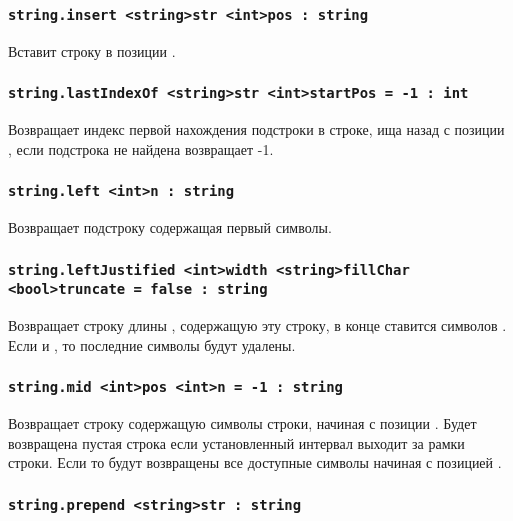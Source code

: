 \documentclass[a4paper, 14pt]{extarticle}
\begin{document}
\subsubsection{\lstinline|string.insert <string>str <int>pos : string|}

Вставит строку  в позиции .

\subsubsection{\lstinline|string.lastIndexOf <string>str <int>startPos = -1 : int|}

Возвращает индекс первой нахождения подстроки  в строке, ища назад с позиции , если подстрока не найдена возвращает -1.

\subsubsection{\lstinline|string.left <int>n : string|}

Возвращает подстроку содержащая первый  символы.

\subsubsection{\lstinline|string.leftJustified <int>width <string>fillChar <bool>truncate = false : string|}

Возвращает строку длины , содержащую эту строку, в конце ставится  символов . Если  и , то последние  символы будут удалены.

\subsubsection{\lstinline|string.mid <int>pos <int>n = -1 : string|}

Возвращает строку содержащую  символы строки, начиная с позиции . Будет возвращена пустая строка если установленный интервал выходит за рамки строки. Если  то будут возвращены все доступные символы начиная с позицией .

\subsubsection{\lstinline|string.prepend <string>str : string|}
\end{document}

